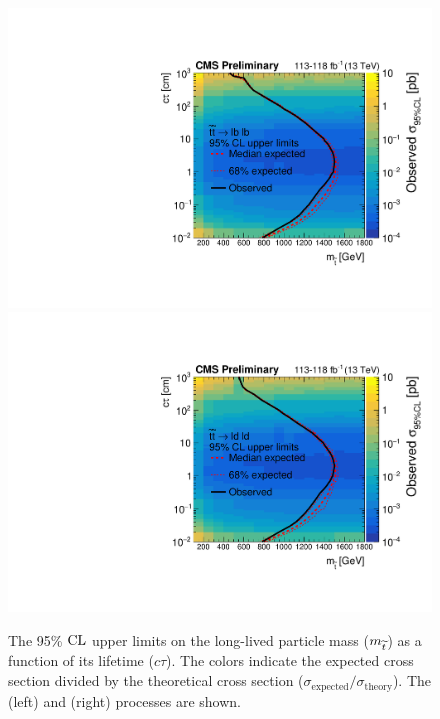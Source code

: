 \begin{figure}[hbtp]
\centering
\includegraphics[scale=0.45]{figures/results/2DlimitsCombinedStopToLB.pdf}
\includegraphics[scale=0.45]{figures/results/2DlimitsCombinedStopToLD.pdf}
\caption{The 95\% $\text{CL}$ upper limits on the long-lived particle mass ($m_{\widetilde{t}}$) as a function of its lifetime ($c\tau$). The colors indicate the expected cross section divided by the theoretical cross section ($\sigma_\text{expected}/\sigma_\text{theory}$). The \stoptolb (left) and \stoptold (right) processes are shown.} 
\label{limits_combined}
\end{figure}